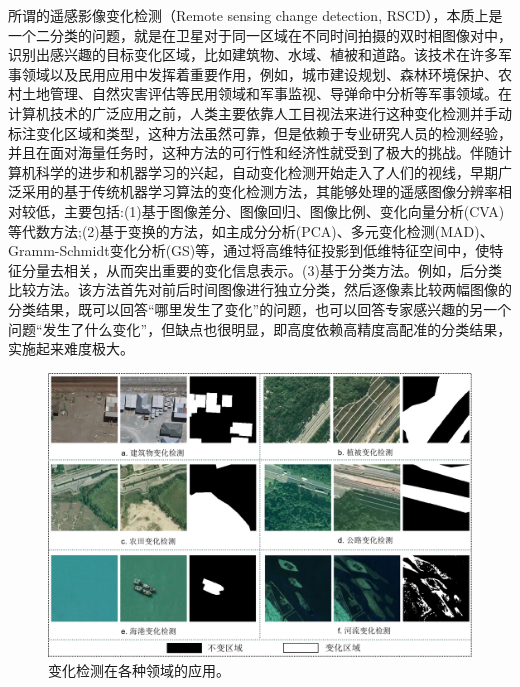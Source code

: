 \documentclass[lang=chs, degree=master, blindreview=false, adobe=false]{yanputhesis}
\begin{document}
所谓的遥感影像变化检测（Remote sensing change detection, RSCD），本质上是一个二分类的问题，就是在卫星对于同一区域在不同时间拍摄的双时相图像对中，识别出感兴趣的目标变化区域，比如建筑物、水域、植被和道路。该技术在许多军事领域以及民用应用中发挥着重要作用，例如，城市建设规划、森林环境保护、农村土地管理、自然灾害评估等民用领域和军事监视、导弹命中分析等军事领域。在计算机技术的广泛应用之前，人类主要依靠人工目视法来进行这种变化检测并手动标注变化区域和类型，这种方法虽然可靠，但是依赖于专业研究人员的检测经验，并且在面对海量任务时，这种方法的可行性和经济性就受到了极大的挑战。伴随计算机科学的进步和机器学习的兴起，自动变化检测开始走入了人们的视线，早期广泛采用的基于传统机器学习算法的变化检测方法，其能够处理的遥感图像分辨率相对较低，主要包括:(1)基于图像差分、图像回归、图像比例、变化向量分析(CVA)等代数方法;(2)基于变换的方法，如主成分分析(PCA)、多元变化检测(MAD)、Gramm-Schmidt变化分析(GS)等，通过将高维特征投影到低维特征空间中，使特征分量去相关，从而突出重要的变化信息表示。(3)基于分类方法。例如，后分类比较方法。该方法首先对前后时间图像进行独立分类，然后逐像素比较两幅图像的分类结果，既可以回答“哪里发生了变化”的问题，也可以回答专家感兴趣的另一个问题“发生了什么变化”，但缺点也很明显，即高度依赖高精度高配准的分类结果，实施起来难度极大。

\begin{figure}[htb]
	\centering
	\includegraphics[scale=0.55]{images/fig1.png}
	\caption{
		变化检测在各种领域的应用。
	}
	\label{fig:background}
\end{figure}
\end{document}
